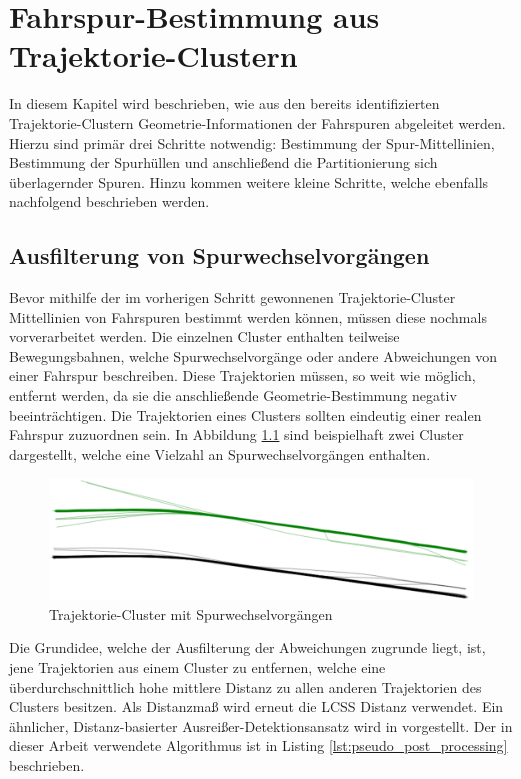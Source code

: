 
\chapter{Fahrspur-Bestimmung aus Trajektorie-Clustern}
\label{cha:lane_definition}

In diesem Kapitel wird beschrieben, wie aus den bereits identifizierten Trajektorie-Clustern
Geometrie-Informationen der Fahrspuren abgeleitet werden. Hierzu sind primär drei Schritte notwendig:
Bestimmung der Spur-Mittellinien, Bestimmung der Spurhüllen und anschließend die Partitionierung sich überlagernder
Spuren. Hinzu kommen weitere kleine Schritte, welche ebenfalls nachfolgend beschrieben werden.

\section{Ausfilterung von Spurwechselvorgängen}
\label{sec:real2_filter_lane_change}

Bevor mithilfe der im vorherigen Schritt gewonnenen Trajektorie-Cluster Mittellinien von Fahrspuren bestimmt
werden können, müssen diese nochmals vorverarbeitet werden. Die einzelnen Cluster enthalten teilweise
Bewegungsbahnen, welche Spurwechselvorgänge oder andere Abweichungen von einer Fahrspur beschreiben.
Diese Trajektorien müssen, so weit wie möglich,
entfernt werden, da sie die anschließende Geometrie-Bestimmung negativ beeinträchtigen. Die Trajektorien
eines Clusters sollten eindeutig einer realen Fahrspur zuzuordnen sein. In Abbildung
\ref{fig:real2_clusters_pre_postpro} sind beispielhaft zwei Cluster dargestellt, welche eine Vielzahl an
Spurwechselvorgängen enthalten.

\begin{figure}[H]
    \centering
    \includegraphics[width=0.8\linewidth]{../resources/img/umsetzung/U2/Clusters_Pre_Postprocessing}
    \caption{Trajektorie-Cluster mit Spurwechselvorgängen}
    \label{fig:real2_clusters_pre_postpro}
\end{figure}

Die Grundidee, welche der Ausfilterung der Abweichungen zugrunde liegt, ist, jene Trajektorien
aus einem Cluster zu entfernen, welche eine überdurchschnittlich hohe mittlere Distanz zu allen anderen
Trajektorien des Clusters besitzen. Als Distanzmaß wird erneut die LCSS Distanz verwendet.
Ein ähnlicher, Distanz-basierter Ausreißer-Detektionsansatz wird in \cite[]{Mirge2017} vorgestellt.
Der in dieser Arbeit verwendete Algorithmus ist in Listing \ref{lst:pseudo_post_processing} beschrieben.

